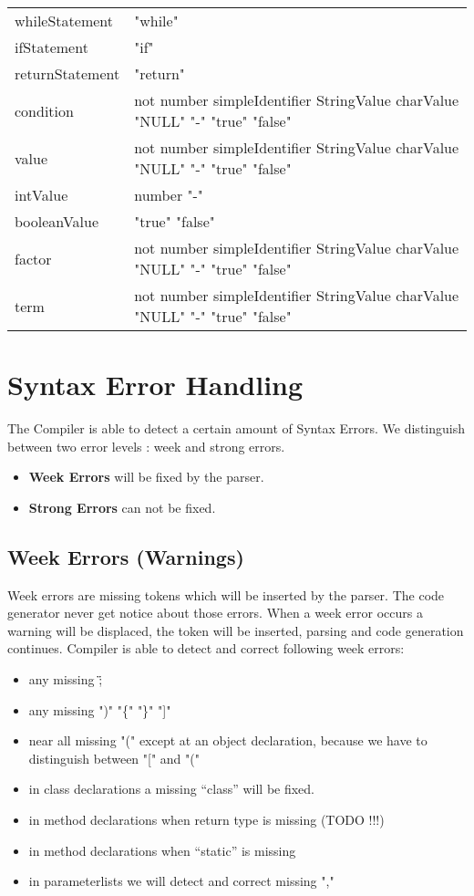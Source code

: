 \begin{tabular}{p{4cm}l}
whileStatement & "while" \\
ifStatement & "if" \\
returnStatement & "return" \\
condition & not number simpleIdentifier StringValue charValue "NULL" "-" "true" "false" \\
value & not number simpleIdentifier StringValue charValue "NULL" "-" "true" "false" \\
intValue & number "-" \\
booleanValue & "true" "false" \\
factor & not number simpleIdentifier StringValue charValue "NULL" "-" "true" "false" \\
term & not number simpleIdentifier StringValue charValue "NULL" "-" "true" "false" \\
\end{tabular}
%
\section{Syntax Error Handling}
The Compiler is able to detect a certain amount of Syntax Errors. We distinguish between two error levels : week and strong errors.
\begin{itemize}
  \item \textbf{Week Errors} will be fixed by the parser. 
  \item \textbf{Strong Errors} can not be fixed. 
\end{itemize}

\subsection{Week Errors (Warnings)}
\label{label_week_errors}
Week errors are missing tokens which will be inserted by the parser.
The code generator never get notice about those errors. When a week error occurs a warning will be displaced, the token will be
inserted, parsing and code generation continues.
Compiler is able to detect and correct following week errors:
\begin{itemize}
  \item any missing \";\"
  \item any missing ")" "\{" "\}" "]" 
  \item near all missing "(" except at an object declaration, because we have to distinguish between "[" and "(" 
  \item in class declarations a missing ``class'' will be fixed.
  \item in method declarations when return type is missing (TODO !!!)
  \item in method declarations when ``static'' is missing
  \item in parameterlists we will detect and correct missing ","
\end{itemize}

